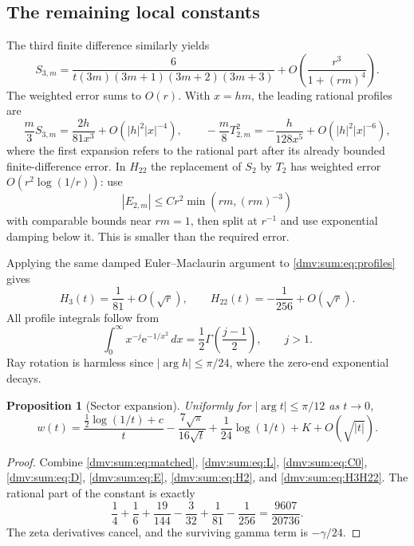 \documentclass[11pt,letterpaper]{article}
\numberwithin{equation}{section}
\newtheorem{proposition}[theorem]{Proposition}
\theoremstyle{definition}\newtheorem{definition}[theorem]{Definition}
\theoremstyle{remark}\newtheorem{remark}[theorem]{Remark}
\newcommand{\ee}{\mathrm e}
\begin{document}
\subsection{The remaining local constants}
The third finite difference similarly yields
\begin{equation}\label{dmv:sum:eq:S3}
 S_{3,m}=\frac6{t(3m)(3m+1)(3m+2)(3m+3)}
           +O\!\left(\frac{r^3}{1+(rm)^4}\right).
\end{equation}
The weighted error sums to $O(r)$. With $x=hm$, the leading rational profiles are
\begin{equation}\label{dmv:sum:eq:profiles}
 \frac m3S_{3,m}=\frac{2h}{81x^3}+O(|h|^2|x|^{-4}),\qquad
 -\frac m8T_{2,m}^2=-\frac h{128x^5}+O(|h|^2|x|^{-6}),
\end{equation}
where the first expansion refers to the rational part after its already bounded finite-difference error. In $H_{22}$ the replacement of $S_2$ by $T_2$ has weighted error $O(r^2\log(1/r))$: use
\[
 |E_{2,m}|\le Cr^2\min(rm,(rm)^{-3})
\]
with comparable bounds near $rm=1$, then split at $r^{-1}$ and use exponential damping below it. This is smaller than the required error.

Applying the same damped Euler--Maclaurin argument to \eqref{dmv:sum:eq:profiles} gives
\begin{equation}\label{dmv:sum:eq:H3H22}
 H_3(t)=\frac1{81}+O(\sqrt r),\qquad
 H_{22}(t)=-\frac1{256}+O(\sqrt r).
\end{equation}
All profile integrals follow from
\[
 \int_0^\infty x^{-j}\ee^{-1/x^2}\,dx=\frac12\Gamma\left(\frac{j-1}2\right),\qquad j>1.
\]
Ray rotation is harmless since $|\arg h|\le\pi/24$, where the zero-end exponential decays.

\begin{proposition}[Sector expansion]\label{dmv:sum:prop:radial}
Uniformly for $|\arg t|\le\pi/12$ as $t\to0$,
\begin{equation}\label{dmv:sum:eq:radial}
 w(t)=\frac{\tfrac12\log(1/t)+c}{t}-\frac{7\sqrt\pi}{16\sqrt t}
                     +\frac1{24}\log(1/t)+K+O(\sqrt{|t|}).
\end{equation}
\end{proposition}
\begin{proof}
Combine \eqref{dmv:sum:eq:matched}, \eqref{dmv:sum:eq:L}, \eqref{dmv:sum:eq:C0}, \eqref{dmv:sum:eq:D}, \eqref{dmv:sum:eq:E}, \eqref{dmv:sum:eq:H2}, and \eqref{dmv:sum:eq:H3H22}. The rational part of the constant is exactly
\[
 \frac14+\frac16+\frac{19}{144}-\frac3{32}+\frac1{81}-\frac1{256}
       =\frac{9607}{20736}.
\]
The zeta derivatives cancel, and the surviving gamma term is $-\gamma/24$.
\end{proof}
\end{document}
